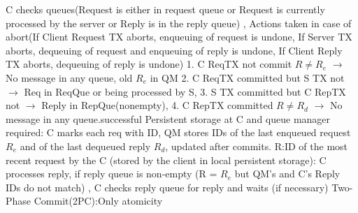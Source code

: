 C checks queues(Request is either in request queue or Request is currently processed by the server or Reply is in the reply queue)
, Actions taken in case of abort(If Client Request TX aborts, enqueuing of request is undone,
If Server TX aborts, dequeuing of request and enqueuing of reply is undone,
If Client Reply TX aborts, dequeuing of reply is undone)
\textbar {}
1. C ReqTX not commit $R \neq R_e$ $\rightarrow$ No message in any queue, old $R_e$ in QM
2. C ReqTX committed but S TX not $\rightarrow$ Req in ReqQue or being processed by S,
3. S TX committed but C RepTX not $\rightarrow$ Reply in RepQue(nonempty),
4. C RepTX committed $R \neq R_d$ $\rightarrow$ No message in any queue.successful
Persistent storage at C and queue manager required:
C marks each req with ID, QM stores IDs of the last enqueued request $R_e$
and of the last dequeued reply $R_d$, updated after commits.
R:ID of the most recent request by the C (stored by the client in local persistent storage):
C processes reply, if reply queue is non-empty (R = $R_e$ but QM’s and C's Reply IDs do not match)
, C checks reply queue for reply and waits (if necessary)
 Two-Phase Commit(2PC):Only atomicity

